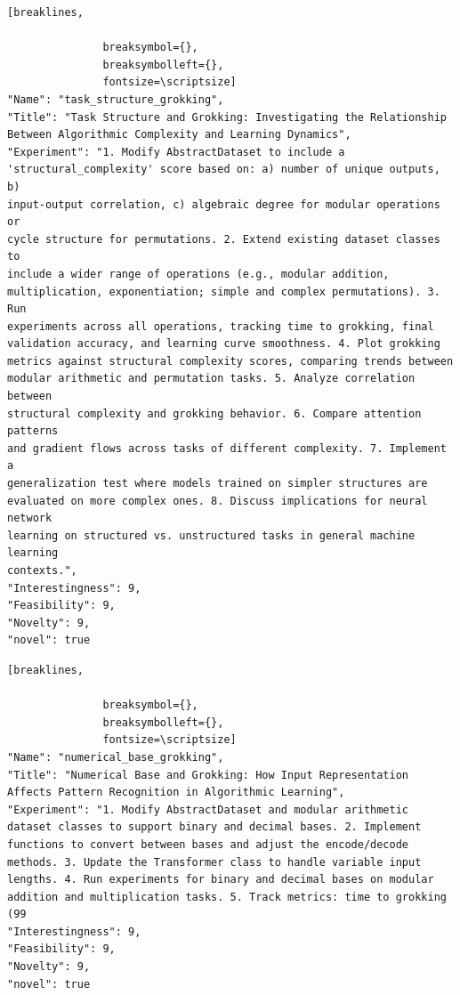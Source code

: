 \begin{tcolorbox}[
  breakable,
  colback  = blue!5!white,
  colframe = blue!75!black,
  title    = {Idea 40/50 - \texttt{task\_structure\_grokking}},
  fontupper=\scriptsize\ttfamily,
]
\begin{Verbatim}[breaklines,

               breaksymbol={},
               breaksymbolleft={},
               fontsize=\scriptsize]
"Name": "task_structure_grokking",
"Title": "Task Structure and Grokking: Investigating the Relationship Between Algorithmic Complexity and Learning Dynamics",
"Experiment": "1. Modify AbstractDataset to include a
'structural_complexity' score based on: a) number of unique outputs, b)
input-output correlation, c) algebraic degree for modular operations or
cycle structure for permutations. 2. Extend existing dataset classes to
include a wider range of operations (e.g., modular addition,
multiplication, exponentiation; simple and complex permutations). 3. Run
experiments across all operations, tracking time to grokking, final
validation accuracy, and learning curve smoothness. 4. Plot grokking
metrics against structural complexity scores, comparing trends between
modular arithmetic and permutation tasks. 5. Analyze correlation between
structural complexity and grokking behavior. 6. Compare attention patterns
and gradient flows across tasks of different complexity. 7. Implement a
generalization test where models trained on simpler structures are
evaluated on more complex ones. 8. Discuss implications for neural network
learning on structured vs. unstructured tasks in general machine learning
contexts.",
"Interestingness": 9,
"Feasibility": 9,
"Novelty": 9,
"novel": true
\end{Verbatim}
\end{tcolorbox}

\begin{tcolorbox}[
  breakable,
  colback  = blue!5!white,
  colframe = blue!75!black,
  title    = {Idea 41/50 - \texttt{numerical\_base\_grokking}},
  fontupper=\scriptsize\ttfamily,
]
\begin{Verbatim}[breaklines,

               breaksymbol={},
               breaksymbolleft={},
               fontsize=\scriptsize]
"Name": "numerical_base_grokking",
"Title": "Numerical Base and Grokking: How Input Representation Affects Pattern Recognition in Algorithmic Learning",
"Experiment": "1. Modify AbstractDataset and modular arithmetic dataset classes to support binary and decimal bases. 2. Implement functions to convert between bases and adjust the encode/decode methods. 3. Update the Transformer class to handle variable input lengths. 4. Run experiments for binary and decimal bases on modular addition and multiplication tasks. 5. Track metrics: time to grokking (99
"Interestingness": 9,
"Feasibility": 9,
"Novelty": 9,
"novel": true
\end{Verbatim}
\end{tcolorbox}

